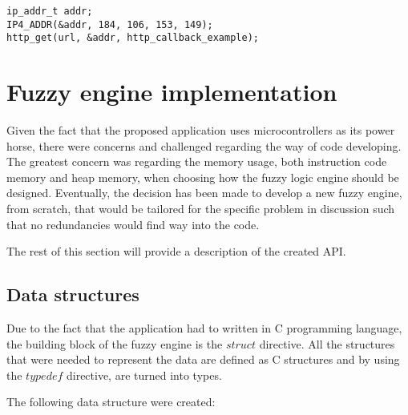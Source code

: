 \begin{lstlisting}[frame=single]
ip_addr_t addr;
IP4_ADDR(&addr, 184, 106, 153, 149);
http_get(url, &addr, http_callback_example);
\end{lstlisting}


\section{Fuzzy engine implementation}

\qquad Given the fact that the proposed application uses microcontrollers as its power horse, there were
concerns and challenged regarding the way of code developing. The greatest concern was regarding the memory
usage, both instruction code memory and heap memory, when choosing how the fuzzy logic engine should be
designed. Eventually, the decision has been made to develop a new fuzzy engine, from scratch, that would be
tailored for the specific problem in discussion such that no redundancies would find way into the code.

\qquad The rest of this section will provide a description of the created API.

\subsection{Data structures}
\label{subsec:data_structures}

\qquad Due to the fact that the application had to written in C programming language, the building block
of the fuzzy engine is the $struct$ directive. All the structures that were needed to represent the data
are defined as C structures and by using the $typedef$ directive, are turned into types.

\qquad The following data structure were created:

